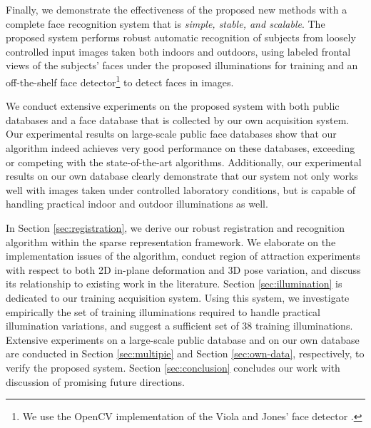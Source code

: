 \documentclass[12pt,journal,draftcls,letterpaper,onecolumn]{IEEEtran}
\providecommand{\DIFaddbegin}{} %
\providecommand{\DIFaddend}{} %
\providecommand{\DIFdelbegin}{} %
\providecommand{\DIFdelend}{} %
\begin{document}


Finally, we demonstrate the effectiveness of the proposed new
methods with a complete face recognition system that is {\em
simple, stable, and scalable}. The proposed system performs
robust automatic recognition of subjects from loosely
controlled input images taken both indoors and outdoors, using
labeled frontal views of the subjects' faces under the proposed
illuminations for training and an off-the-shelf face
detector\footnote{We use the OpenCV
implementation of the Viola and Jones' face detector
\cite{Viola2004-IJCV}.} to detect faces in images.

We conduct extensive experiments on the proposed system with
both public databases and a face database that is collected by
our own acquisition system. Our experimental results on
large-scale public face databases show that our algorithm
indeed achieves very good performance on these databases,
exceeding or competing with the state-of-the-art algorithms. 
Additionally, our experimental results on our own database
clearly demonstrate that our system not only works well with
images taken under controlled laboratory conditions, but is
capable of handling practical indoor and outdoor illuminations as well.

\DIFdelbegin %
\DIFdelend \DIFaddbegin {} \DIFaddend In Section
\ref{sec:registration}, we derive our robust registration and
recognition algorithm within the sparse representation
framework. We elaborate on the implementation issues of the
algorithm, conduct region of attraction experiments with
respect to both 2D in-plane deformation and 3D pose variation,
and discuss its relationship to existing work in the
literature. Section \ref{sec:illumination} is dedicated to our
training acquisition system. Using this system, we investigate empirically the set of training illuminations required to handle practical illumination variations, and suggest a sufficient set of 38 training illuminations. Extensive experiments on
a large-scale public database and on our own database are conducted
in Section \ref{sec:multipie} and Section \ref{sec:own-data},
respectively, to verify the proposed system. Section
\ref{sec:conclusion} concludes our work with discussion of
promising future directions.
\end{document}
